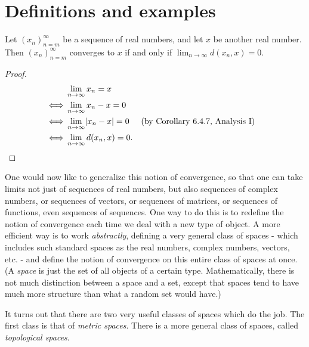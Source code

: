\section{Definitions and examples}\label{sec:1.1}

\begin{lem}\label{1.1.1}
  Let \((x_n)_{n = m}^\infty\) be a sequence of real numbers, and let \(x\) be another real number.
  Then \((x_n)_{n = m}^\infty\) converges to \(x\) if and only if \(\lim_{n \to \infty} d(x_n, x) = 0\).
\end{lem}

\begin{proof}
  \begin{align*}
         & \lim_{n \to \infty} x_n = x                                                        \\
    \iff & \lim_{n \to \infty} x_n - x = 0                                                    \\
    \iff & \lim_{n \to \infty} \abs{x_n - x} = 0 &  & \text{(by Corollary 6.4.7, Analysis I)} \\
    \iff & \lim_{n \to \infty} d(x_n, x) = 0.
  \end{align*}
\end{proof}

\begin{note}
  One would now like to generalize this notion of convergence, so that one can take limits not just of sequences of real numbers, but also sequences of complex numbers, or sequences of vectors, or sequences of matrices, or sequences of functions, even sequences of sequences.
  One way to do this is to redefine the notion of convergence each time we deal with a new type of object.
  A more efficient way is to work \emph{abstractly}, defining a very general class of spaces - which includes such standard spaces as the real numbers, complex numbers, vectors, etc. - and define the notion of convergence on this entire class of spaces at once.
  (A \emph{space} is just the set of all objects of a certain type.
  Mathematically, there is not much distinction between a space and a set, except that spaces tend to have much more structure than what a random set would have.)
\end{note}

\begin{note}
  It turns out that there are two very useful classes of spaces which do the job.
  The first class is that of \emph{metric spaces}.
  There is a more general class of spaces, called \emph{topological spaces}.
\end{note}

